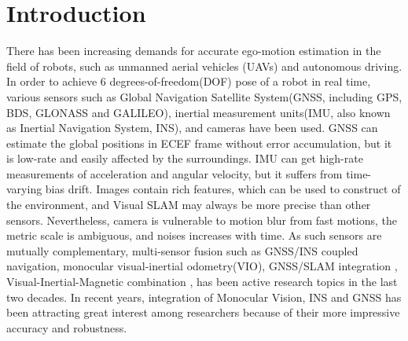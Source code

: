 \documentclass[journal,article,submit,moreauthors,pdftex]{Definitions/mdpi}
\begin{document}

\section{Introduction}
There has been increasing demands for accurate  ego-motion estimation in the field of robots, such as unmanned aerial vehicles (UAVs) and autonomous driving. In order to achieve 6 degrees-of-freedom(DOF) pose of a robot in real time, various sensors such as Global Navigation Satellite System(GNSS, including GPS, BDS, GLONASS and GALILEO), inertial measurement units(IMU, also known as Inertial Navigation System, INS), and cameras have been used\cite{hongVisualInertialOdometryRobust2018}.  GNSS can estimate the global positions in ECEF frame without error accumulation, but it is low-rate and easily affected by the surroundings. IMU can get high-rate measurements of acceleration and angular velocity,  but it suffers from time-varying bias drift. Images contain rich features, which can be used to construct of the environment, and Visual SLAM may always be more precise than other sensors. Nevertheless, camera is vulnerable to motion blur from fast motions, the metric scale is ambiguous, and noises increases with time. As such sensors are mutually complementary\cite{huangOnlineInitializationExtrinsic2020}, multi-sensor fusion such as GNSS/INS coupled navigation, monocular visual-inertial odometry(VIO), GNSS/SLAM integration \cite{chenIntegrationLowcostGNSS2018}, Visual-Inertial-Magnetic combination \cite{wangVIMOVisualInertialMagneticNavigation2020}, has been active research topics in the last two decades. In recent years, integration of Monocular Vision, INS and GNSS has been attracting great interest among researchers because of their more impressive accuracy and robustness.
\end{document}
